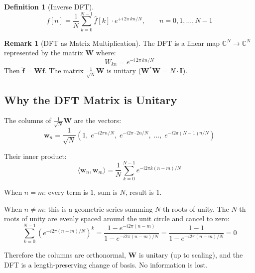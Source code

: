 \documentclass[11pt,a4paper]{article}
\theoremstyle{definition}
\newtheorem{definition}{Definition}[section]
\newtheorem{remark}{Remark}[section]
\begin{document}
\begin{definition}[Inverse DFT]
\begin{equation}
    f[n] = \frac{1}{N} \sum_{k=0}^{N-1} \hat{f}[k] \cdot e^{+i \, 2\pi \, kn / N}, \qquad n = 0, 1, \ldots, N-1
\end{equation}
\end{definition}

\begin{remark}[DFT as Matrix Multiplication]
The DFT is a linear map $\mathbb{C}^N \to \mathbb{C}^N$ represented by the matrix $\mathbf{W}$ where:
\begin{equation}
    W_{kn} = e^{-i \, 2\pi \, kn / N}
\end{equation}
Then $\hat{\mathbf{f}} = \mathbf{W} \mathbf{f}$. The matrix $\frac{1}{\sqrt{N}} \mathbf{W}$ is unitary ($\mathbf{W}^* \mathbf{W} = N \cdot \mathbf{I}$).
\end{remark}

\subsection{Why the DFT Matrix is Unitary}

The columns of $\frac{1}{\sqrt{N}}\mathbf{W}$ are the vectors:
\begin{equation}
    \mathbf{w}_n = \frac{1}{\sqrt{N}} \left(1, \; e^{-i2\pi n/N}, \; e^{-i2\pi \cdot 2n/N}, \; \ldots, \; e^{-i2\pi(N-1)n/N}\right)
\end{equation}

Their inner product:
\begin{equation}
    \langle \mathbf{w}_n, \mathbf{w}_m \rangle = \frac{1}{N} \sum_{k=0}^{N-1} e^{-i2\pi k(n-m)/N}
\end{equation}

When $n = m$: every term is $1$, sum is $N$, result is $1$.

When $n \neq m$: this is a geometric series summing $N$-th roots of unity. The $N$-th roots of unity are evenly spaced around the unit circle and cancel to zero:
\begin{equation}
    \sum_{k=0}^{N-1} \left(e^{-i2\pi(n-m)/N}\right)^k = \frac{1 - e^{-i2\pi(n-m)}}{1 - e^{-i2\pi(n-m)/N}} = \frac{1 - 1}{1 - e^{-i2\pi(n-m)/N}} = 0
\end{equation}

Therefore the columns are orthonormal, $\mathbf{W}$ is unitary (up to scaling), and the DFT is a length-preserving change of basis. No information is lost.
\end{document}
